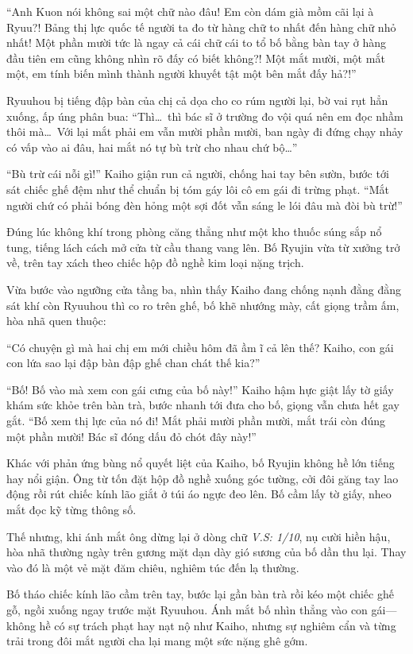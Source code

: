 ﻿\documentclass[../main.tex]{subfiles}
\begin{document}
``Anh Kuon nói không sai một chữ nào đâu! Em còn dám già mồm cãi lại à Ryuu?! Bảng thị lực quốc tế người ta đo từ hàng chữ to nhất đến hàng chữ nhỏ nhất! Một phần mười tức là ngay cả cái chữ cái to tổ bố bằng bàn tay ở hàng đầu tiên em cũng không nhìn rõ đấy có biết không?! Một mắt mười, một mắt một, em tính biến mình thành người khuyết tật một bên mắt đấy hả?!''

Ryuuhou bị tiếng đập bàn của chị cả dọa cho co rúm người lại, bờ vai rụt hẳn xuống, ấp úng phân bua: ``Thì\dots\ thì bác sĩ ở trường đo vội quá nên em đọc nhầm thôi mà\dots\ Với lại mắt phải em vẫn mười phần mười, ban ngày đi đứng chạy nhảy có vấp vào ai đâu, hai mắt nó tự bù trừ cho nhau chứ bộ\dots''

``Bù trừ cái nỗi gì!'' Kaiho giận run cả người, chống hai tay bên sườn, bước tới sát chiếc ghế đệm như thể chuẩn bị tóm gáy lôi cô em gái đi trừng phạt. ``Mắt người chứ có phải bóng đèn hỏng một sợi đốt vẫn sáng le lói đâu mà đòi bù trừ!''

Đúng lúc không khí trong phòng căng thẳng như một kho thuốc súng sắp nổ tung, tiếng lách cách mở cửa từ cầu thang vang lên. Bố Ryujin vừa từ xưởng trở về, trên tay xách theo chiếc hộp đồ nghề kim loại nặng trịch.

Vừa bước vào ngưỡng cửa tầng ba, nhìn thấy Kaiho đang chống nạnh đằng đằng sát khí còn Ryuuhou thì co ro trên ghế, bố khẽ nhướng mày, cất giọng trầm ấm, hòa nhã quen thuộc:

``Có chuyện gì mà hai chị em mới chiều hôm đã ầm ĩ cả lên thế? Kaiho, con gái con lứa sao lại đập bàn đập ghế chan chát thế kia?''

``Bố! Bố vào mà xem con gái cưng của bố này!'' Kaiho hậm hực giật lấy tờ giấy khám sức khỏe trên bàn trà, bước nhanh tới đưa cho bố, giọng vẫn chưa hết gay gắt. ``Bố xem thị lực của nó đi! Mắt phải mười phần mười, mắt trái còn đúng một phần mười! Bác sĩ đóng dấu đỏ chót đây này!''

Khác với phản ứng bùng nổ quyết liệt của Kaiho, bố Ryujin không hề lớn tiếng hay nổi giận. Ông từ tốn đặt hộp đồ nghề xuống góc tường, cởi đôi găng tay lao động rồi rút chiếc kính lão giắt ở túi áo ngực đeo lên. Bố cầm lấy tờ giấy, nheo mắt đọc kỹ từng thông số.

Thế nhưng, khi ánh mắt ông dừng lại ở dòng chữ \textit{V.S: 1/10}, nụ cười hiền hậu, hòa nhã thường ngày trên gương mặt dạn dày gió sương của bố dần thu lại. Thay vào đó là một vẻ mặt đăm chiêu, nghiêm túc đến lạ thường.

Bố tháo chiếc kính lão cầm trên tay, bước lại gần bàn trà rồi kéo một chiếc ghế gỗ, ngồi xuống ngay trước mặt Ryuuhou. Ánh mắt bố nhìn thẳng vào con gái—không hề có sự trách phạt hay nạt nộ như Kaiho, nhưng sự nghiêm cẩn và từng trải trong đôi mắt người cha lại mang một sức nặng ghê gớm.
\end{document}
